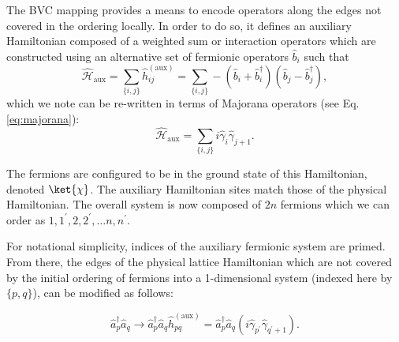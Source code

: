 The BVC mapping provides a means to encode operators along the edges not covered in the ordering locally. In order to do so, it defines an auxiliary Hamiltonian composed of a weighted sum or interaction operators which are constructed using an alternative set of fermionic operators $\hat{b}_i$ such that
\begin{equation}
    \hat{\mathcal{H}}_{\mathrm{aux}} = \sum_{\{i, j\}} \hat{h}_{ij}^{(\mathrm{aux})} = \sum_{\{i, j\}} - (\hat{b}_i + \hat{b}_i^{\dagger})(\hat{b}_j - \hat{b}_j^{\dagger}), 
\end{equation}
which we note can be re-written in terms of Majorana operators (see Eq. \ref{eq:majorana}): 
\begin{equation}\label{eq:auxiliary_couplings}
    \hat{\mathcal{H}}_{\mathrm{aux}} = \sum_{\{i, j\}} i \hat{\gamma}_i \hat{\gamma}_{j+1}. 
\end{equation}

The fermions are configured to be in the ground state of this Hamiltonian, denoted $\ket{\chi}$. The auxiliary Hamiltonian sites match those of the physical Hamiltonian. The overall system is now composed of $2n$ fermions which we can order as $1, 1^{\prime}, 2, 2^{\prime}, \dots n, n^{\prime}$.   

For notational simplicity, indices of the auxiliary fermionic system are primed. From there, the edges of the physical lattice Hamiltonian which are not covered by the initial ordering of fermions into a 1-dimensional system (indexed here by $\{p, q \}$), can be modified as follows:

\begin{equation}
    \hat{a}^{\dagger}_p\hat{a}_q \rightarrow \hat{a}^{\dagger}_p\hat{a}_q \hat{h}_{pq}^{(\mathrm{aux})} = \hat{a}^{\dagger}_p\hat{a}_q \left(i \hat{\gamma}_{p^{\prime}} \hat{\gamma}_{q^{\prime} + 1} \right).
\end{equation}

